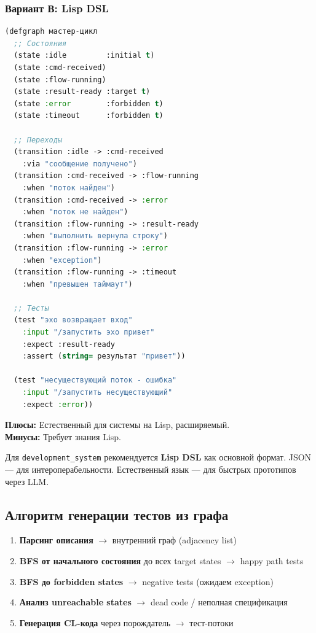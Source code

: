 \documentclass[12pt, a4paper, twoside]{article}
\begin{document}
\subsubsection{Вариант В: Lisp DSL}

\begin{lstlisting}[language=CommonLisp,caption={Граф в Lisp DSL}]
(defgraph мастер-цикл
  ;; Состояния
  (state :idle         :initial t)
  (state :cmd-received)
  (state :flow-running)
  (state :result-ready :target t)
  (state :error        :forbidden t)
  (state :timeout      :forbidden t)

  ;; Переходы
  (transition :idle -> :cmd-received
    :via "сообщение получено")
  (transition :cmd-received -> :flow-running
    :when "поток найден")
  (transition :cmd-received -> :error
    :when "поток не найден")
  (transition :flow-running -> :result-ready
    :when "выполнить вернула строку")
  (transition :flow-running -> :error
    :when "exception")
  (transition :flow-running -> :timeout
    :when "превышен таймаут")

  ;; Тесты
  (test "эхо возвращает вход"
    :input "/запустить эхо привет"
    :expect :result-ready
    :assert (string= результат "привет"))

  (test "несуществующий поток - ошибка"
    :input "/запустить несуществующий"
    :expect :error))
\end{lstlisting}

\textbf{Плюсы:} Естественный для системы на Lisp, расширяемый.\\
\textbf{Минусы:} Требует знания Lisp.

\begin{successbox}[title={Рекомендация}]
Для \texttt{development\_system} рекомендуется \textbf{Lisp DSL} как основной
формат. JSON --- для интероперабельности. Естественный язык --- для быстрых
прототипов через LLM.
\end{successbox}

\subsection{Алгоритм генерации тестов из графа}

\begin{enumerate}[leftmargin=1.5em]
  \item \textbf{Парсинг описания} $\to$ внутренний граф (adjacency list)
  \item \textbf{BFS от начального состояния} до всех target states $\to$ happy path tests
  \item \textbf{BFS до forbidden states} $\to$ negative tests (ожидаем exception)
  \item \textbf{Анализ unreachable states} $\to$ dead code / неполная спецификация
  \item \textbf{Генерация CL-кода} через порождатель $\to$ тест-потоки
\end{enumerate}
\end{document}
